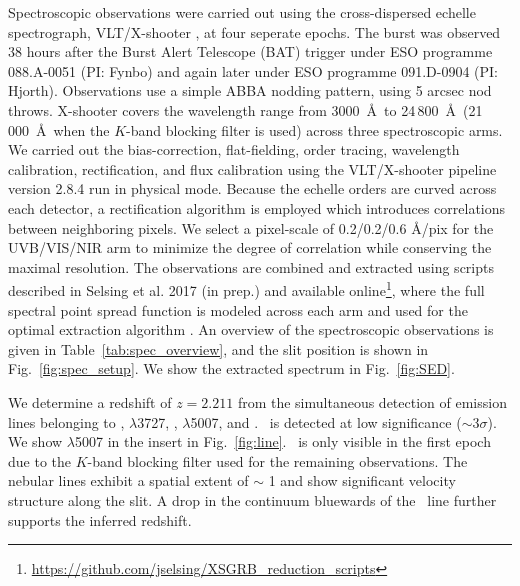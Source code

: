 \documentclass{aa}    %
\begin{document}
Spectroscopic observations were carried out using the cross-dispersed echelle
spectrograph, VLT/X-shooter \citep{Vernet2011}, at four seperate epochs. The
burst was observed 38 hours after the Burst Alert Telescope (BAT) trigger under
ESO programme 088.A-0051 (PI: Fynbo) and again later under ESO programme
091.D-0904 (PI: Hjorth). Observations use a simple ABBA nodding pattern, using 5
arcsec nod throws. X-shooter covers the wavelength range from 3000~\AA~to
24\,800~\AA~(21\,000~\AA~when the $K$-band blocking filter is used) across three
spectroscopic arms. We carried out the bias-correction, flat-fielding, order
tracing, wavelength calibration, rectification, and flux calibration using the
VLT/X-shooter pipeline version 2.8.4 \citep{Goldoni2006, Modigliani2010} run in physical
mode. Because the echelle orders are curved across each detector, a
rectification algorithm is employed which introduces correlations between
neighboring pixels. We select a pixel-scale of 0.2/0.2/0.6 \AA/pix for the
UVB/VIS/NIR arm to minimize the degree of correlation while conserving the
maximal resolution. The observations are combined and extracted using scripts
described in Selsing et al. 2017 (in prep.) and available
online\footnote{\url{https://github.com/jselsing/XSGRB_reduction_scripts}},
where the full spectral point spread function is modeled across each arm and
used for the optimal extraction algorithm \citep{Horne1986}. An overview of the
spectroscopic observations is given in Table~\ref{tab:spec_overview}, and the
slit position is shown in Fig.~\ref{fig:spec_setup}. We show the extracted
spectrum in Fig.~\ref{fig:SED}.



We determine a redshift of $z = 2.211$ from the simultaneous detection of
emission lines belonging to \lya, \oii$\lambda$3727, \hb, \oiii$\lambda$5007,
and \ha. \hb~is detected at low significance ($\sim 3 \sigma$). We show
\oiii$\lambda$5007 in the insert in Fig.~\ref{fig:line}.  \ha~is only visible in
the first epoch due to the $K$-band blocking filter used for the remaining
observations. The nebular lines exhibit a spatial extent of $\sim$ 1 and
show significant velocity structure along the slit. A drop in the continuum
bluewards of the \lya~line further supports the inferred redshift.
\end{document}
